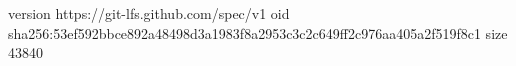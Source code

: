 version https://git-lfs.github.com/spec/v1
oid sha256:53ef592bbce892a48498d3a1983f8a2953c3c2c649ff2c976aa405a2f519f8c1
size 43840
